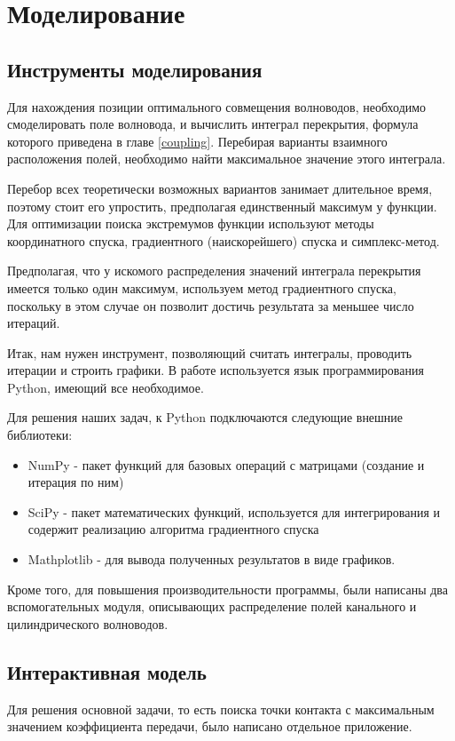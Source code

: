 \chapter{Моделирование}
\section{Инструменты моделирования}
Для нахождения позиции оптимального совмещения волноводов, необходимо смоделировать поле волновода, и вычислить интеграл перекрытия, формула которого приведена в главе \ref{coupling}. Перебирая варианты взаимного расположения полей, необходимо найти максимальное значение этого интеграла.

Перебор всех теоретически возможных вариантов занимает длительное время, поэтому стоит его упростить, предполагая единственный максимум у функции. Для оптимизации поиска экстремумов функции используют методы координатного спуска, градиентного (наискорейшего) спуска и симплекс-метод.\cite{numeric} 

Предполагая, что у искомого распределения значений интеграла перекрытия имеется только один максимум, используем метод градиентного спуска, поскольку в этом случае он позволит достичь результата за меньшее число итераций. \cite{mathews}

Итак, нам нужен инструмент, позволяющий считать интегралы, проводить итерации и строить графики. В работе используется язык программирования Python, имеющий все необходимое. 

Для решения наших задач, к Python подключаются следующие внешние библиотеки:
\begin{itemize}
	\item NumPy - пакет функций для базовых операций с матрицами (создание и итерация по ним)
	\item SciPy - пакет математических функций, используется для интегрирования и содержит реализацию алгоритма градиентного спуска
	\item Mathplotlib - для вывода полученных результатов в виде графиков.
\end{itemize}

Кроме того, для повышения производительности программы, были написаны два вспомогательных модуля, описывающих распределение полей канального и цилиндрического волноводов.

\section{Интерактивная модель}
Для решения основной задачи, то есть поиска точки контакта с максимальным значением коэффициента передачи, было написано отдельное приложение.

